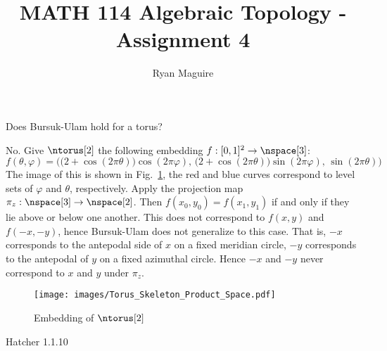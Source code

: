 \documentclass{article}                                                        %
\begin{document}
    \title{MATH 114 Algebraic Topology - Assignment 4}
    \author{Ryan Maguire}
    \date{\vspace{-5ex}}
    \maketitle
    \setcounter{section}{4}
    \begin{problem}
        Does Bursuk-Ulam hold for a torus?
    \end{problem}
    \begin{solution}
        No. Give $\ntorus[2]$ the following embedding
        $f:[0,1]^{2}\rightarrow\nspace[3]$:
        \begin{equation}
            f(\theta,\varphi)=\Big(
                \big(2+\cos(2\pi\theta)\big)\cos(2\pi\varphi),\,
                \big(2+\cos(2\pi\theta)\big)\sin(2\pi\varphi),\,
                \sin(2\pi\theta)
            \Big)
        \end{equation}
        The image of this is shown in Fig.~\ref{fig:Embedding_of_Torus}, the
        red and blue curves correspond to level sets of
        $\varphi$ and $\theta$, respectively. Apply the projection map
        $\pi_{z}:\nspace[3]\rightarrow\nspace[2]$. Then
        $f(x_{0},y_{0})=f(x_{1},y_{1})$ if and only if they lie above or below
        one another. This does not correspond to $f(x,y)$ and
        $f(\minus{x},\minus{y})$, hence Bursuk-Ulam does not generalize to this
        case. That is, $\minus{x}$ corresponds to the antepodal side of $x$ on
        a fixed meridian circle, $\minus{y}$ corresponds to the antepodal of
        $y$ on a fixed azimuthal circle. Hence $\minus{x}$ and $\minus{y}$
        never correspond to $x$ and $y$ under $\pi_{z}$.
    \end{solution}
    \begin{figure}[H]
        \centering
        \captionsetup{type=figure}
        \texttt{[image: images/Torus\_Skeleton\_Product\_Space.pdf]}
        \caption{Embedding of $\ntorus[2]$}
        \label{fig:Embedding_of_Torus}
    \end{figure}
    \begin{problem}
        Hatcher 1.1.10
    \end{problem}
\end{document}
